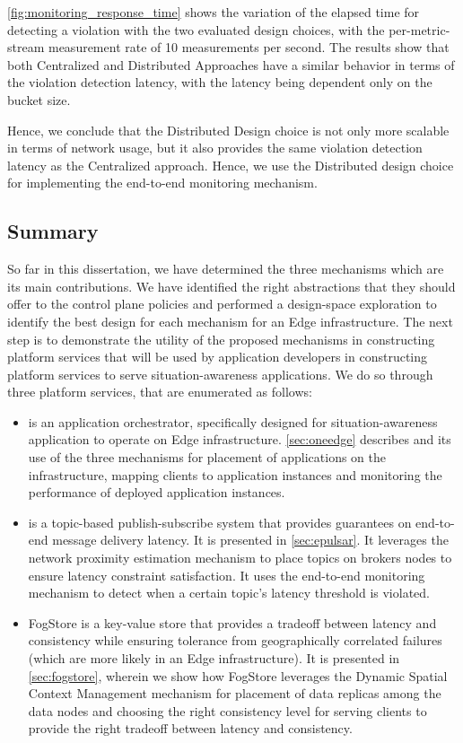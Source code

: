 \cref{fig:monitoring_response_time} shows the variation of the elapsed time for detecting a violation with the two evaluated design choices, with the per-metric-stream measurement rate of 10 measurements per second. The results show that both Centralized and Distributed Approaches have a similar behavior in terms of the violation detection latency, with the latency being dependent only on the bucket size. 
\par Hence, we conclude that the Distributed Design choice is not only more scalable in terms of network usage, but it also provides the same violation detection latency as the Centralized approach. Hence, we use the Distributed design choice for implementing the end-to-end monitoring mechanism.

\subsection*{Summary}
So far in this dissertation, we have determined the three mechanisms which are its main contributions. We have identified the right abstractions that they should offer to the control plane policies and performed a design-space exploration to identify the best design for each mechanism for an Edge infrastructure. The next step is to demonstrate the utility of the proposed mechanisms in constructing platform services that will be used by application developers in constructing platform services to serve situation-awareness applications. We do so through three platform services, that are enumerated as follows:
\begin{itemize}
\item \oneedge{} is an application orchestrator, specifically designed for situation-awareness application to operate on Edge infrastructure. \cref{sec:oneedge} describes \oneedge{} and its use of the three mechanisms for placement of applications on the infrastructure, mapping clients to application instances and monitoring the performance of deployed application instances.
\item \epulsar{} is a topic-based publish-subscribe system that provides guarantees on end-to-end message delivery latency. It is presented in \cref{sec:epulsar}. It leverages the network proximity estimation mechanism to place topics on brokers nodes to ensure latency constraint satisfaction.  It uses the end-to-end monitoring mechanism to detect when a certain topic's latency threshold is violated.
\item FogStore is a key-value store that provides a tradeoff between latency and consistency while ensuring tolerance from geographically correlated failures (which are more likely in an Edge infrastructure). It is presented in \cref{sec:fogstore}, wherein we show how FogStore leverages the Dynamic Spatial Context Management mechanism for placement of data replicas among the data nodes and choosing the right consistency level for serving clients to provide the right tradeoff between latency and consistency.
\end{itemize}


